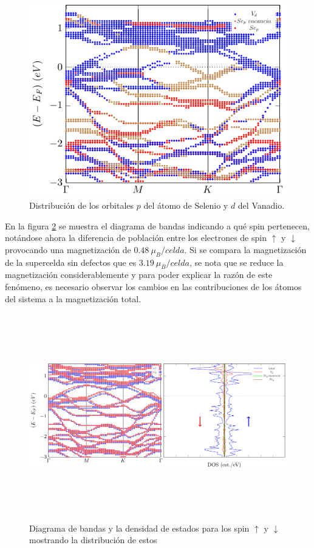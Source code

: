 \begin{figure}[!hbt] 
	\centering
	\includegraphics[scale=1]{figRes/VSe2/def/bandas/soc/bandasSe.pdf}
	\caption[Distribuci\'on de los orbitales de los \'atomos en el diagrama de bandas del VSe\textsubscript{2} con vacancia de Vanadio.]{Distribuci\'on de los orbitales $p$ del \'atomo de Selenio y $d$ del Vanadio.}
	\label{Sim:fig:bandasvse2orb}
\end{figure}
\newline
\par En la figura \ref{Sim:fig:VSe2noSOCcavband} se muestra el diagrama de bandas indicando a qu\'e spin pertenecen, not\'andose ahora la diferencia de poblaci\'on entre los electrones de spin $\uparrow$ y $\downarrow$ provocando una magnetizaci\'on de $0.48 ~\mu_{B}/ celda$. Si se compara la magnetizaci\'on de la supercelda sin defectos que es $3.19~\mu_{B}/celda$, se nota que se reduce la magnetizaci\'on considerablemente y para poder explicar la raz\'on de este fen\'omeno, es necesario observar los cambios en las contribuciones de los \'atomos del sistema a la magnetizaci\'on total. 
\begin{figure}[!hbt]
	\centering
	\includegraphics[width=13cm, height=9cm]{figRes/VSe2/def/bandas/nosoc/bandasDOSnoSoc.pdf}
	\caption[Diagrama de bandas y densidad de estados del VSe\textsubscript{2} con vacancia de Vanadio.]{Diagrama de bandas y la densidad de estados para los spin $\uparrow$ y $\downarrow$ mostrando la distribuci\'on de estos} 
	\label{Sim:fig:VSe2noSOCcavband}
\end{figure}
